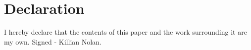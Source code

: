 \chapter{Declaration}
I hereby declare that the contents of this paper and the work surrounding it are my own.
Signed - Killian Nolan.